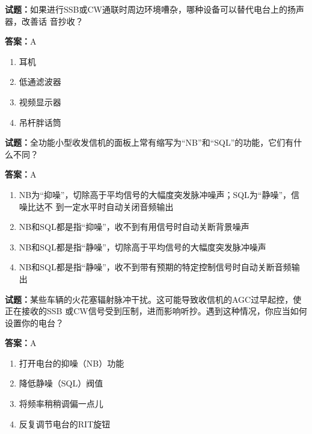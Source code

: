 \documentclass{ctexbook}
\begin{document}
\textbf{试题：}如果进行SSB或CW通联时周边环境嘈杂，哪种设备可以替代电台上的扬声器，改善话
音抄收？ 

\textbf{答案：}A 

\begin{enumerate}[leftmargin=3em]
  \item 耳机 

  \item 低通滤波器 

  \item 视频显示器 


  \item 吊杆胖话筒 

\end{enumerate}





\vspace{1em}

\textbf{试题：}全功能小型收发信机的面板上常有缩写为“NB”和“SQL”的功能，它们有什么不同？ 

\textbf{答案：}A 

\begin{enumerate}[leftmargin=3em]
  \item NB为“抑噪”，切除高于平均信号的大幅度突发脉冲噪声；SQL为“静噪”，信噪比达不
到一定水平时自动关闭音频输出 

  \item NB和SQL都是指“抑噪”，收不到有用信号时自动关断背景噪声 

  \item NB和SQL都是指“静噪”，切除高于平均信号的大幅度突发脉冲噪声 

  \item NB和SQL都是指“静噪”，收不到带有预期的特定控制信号时自动关断音频输出 

\end{enumerate}





\vspace{1em}

\textbf{试题：}某些车辆的火花塞辐射脉冲干扰。这可能导致收信机的AGC过早起控，使正在接收的SSB
或CW信号受到压制，进而影响听抄。遇到这种情况，你应当如何设置你的电台？ 

\textbf{答案：}A 

\begin{enumerate}[leftmargin=3em]
  \item 打开电台的抑噪（NB）功能 

  \item 降低静噪（SQL）阀值 

  \item 将频率稍稍调偏一点儿 

  \item 反复调节电台的RIT旋钮 

\end{enumerate}
\end{document}
